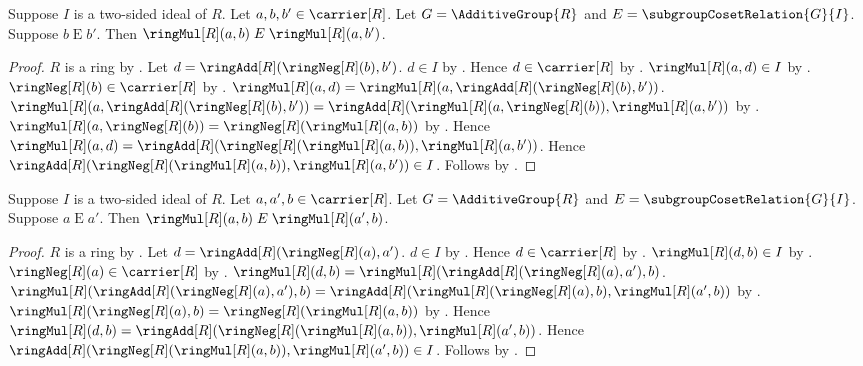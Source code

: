 \begin{lemma}\label{ideal_coset_relation_left_multiplication}
    Suppose $I$ is a two-sided ideal of $R$.
    Let $a,b,b'\in\carrier[R]$.
    Let $G=\AdditiveGroup{R}$ and $E=\subgroupCosetRelation{G}{I}$.
    Suppose $b\mathrel{E}b'$.
    Then $\ringMul[R](a,b)\mathrel{E}\ringMul[R](a,b')$.
\end{lemma}
\begin{proof}
    $R$ is a ring by .
    Let $d=\ringAdd[R](\ringNeg[R](b),b')$.
    $d\in I$ by
        .
    Hence $d\in\carrier[R]$ by
        .
    $\ringMul[R](a,d)\in I$ by
        .
    $\ringNeg[R](b)\in\carrier[R]$ by .
    $\ringMul[R](a,d)=
        \ringMul[R](a,\ringAdd[R](\ringNeg[R](b),b'))$.
    $\ringMul[R](a,\ringAdd[R](\ringNeg[R](b),b'))=
        \ringAdd[R]
            (\ringMul[R](a,\ringNeg[R](b)),
             \ringMul[R](a,b'))$ by
        .
    $\ringMul[R](a,\ringNeg[R](b))
        =\ringNeg[R](\ringMul[R](a,b))$ by
        .
    Hence $\ringMul[R](a,d)=
        \ringAdd[R]
            (\ringNeg[R](\ringMul[R](a,b)),
             \ringMul[R](a,b'))$.
    Hence
        $\ringAdd[R]
            (\ringNeg[R](\ringMul[R](a,b)),
             \ringMul[R](a,b'))\in I$.
    Follows by
        .
\end{proof}

\begin{lemma}\label{ideal_coset_relation_right_multiplication}
    Suppose $I$ is a two-sided ideal of $R$.
    Let $a,a',b\in\carrier[R]$.
    Let $G=\AdditiveGroup{R}$ and $E=\subgroupCosetRelation{G}{I}$.
    Suppose $a\mathrel{E}a'$.
    Then $\ringMul[R](a,b)\mathrel{E}\ringMul[R](a',b)$.
\end{lemma}
\begin{proof}
    $R$ is a ring by .
    Let $d=\ringAdd[R](\ringNeg[R](a),a')$.
    $d\in I$ by
        .
    Hence $d\in\carrier[R]$ by
        .
    $\ringMul[R](d,b)\in I$ by
        .
    $\ringNeg[R](a)\in\carrier[R]$ by .
    $\ringMul[R](d,b)=
        \ringMul[R](\ringAdd[R](\ringNeg[R](a),a'),b)$.
    $\ringMul[R](\ringAdd[R](\ringNeg[R](a),a'),b)=
        \ringAdd[R]
            (\ringMul[R](\ringNeg[R](a),b),
             \ringMul[R](a',b))$ by
        .
    $\ringMul[R](\ringNeg[R](a),b)
        =\ringNeg[R](\ringMul[R](a,b))$ by
        .
    Hence $\ringMul[R](d,b)=
        \ringAdd[R]
            (\ringNeg[R](\ringMul[R](a,b)),
             \ringMul[R](a',b))$.
    Hence
        $\ringAdd[R]
            (\ringNeg[R](\ringMul[R](a,b)),
             \ringMul[R](a',b))\in I$.
    Follows by
        .
\end{proof}

